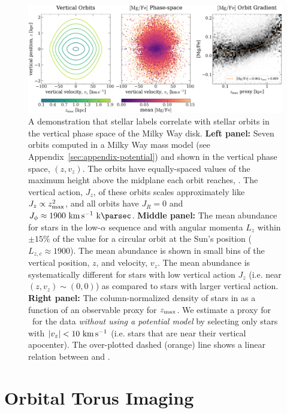 \begin{figure}[t!]
\begin{center}
\includegraphics[width=1\textwidth]{mgfe-zvz.pdf}
\end{center}
\caption{%
A demonstration that stellar labels correlate with stellar orbits in the vertical phase
space of the Milky Way disk.
\textbf{Left panel:} Seven orbits computed in a Milky Way mass model (see
Appendix~\ref{sec:appendix-potential}) and shown in the vertical phase space, $(z,
v_z)$.
The orbits have equally-spaced values of the maximum height above the midplane each
orbit reaches, \zmax.
The vertical action, $J_z$, of these orbits scales approximately like $J_z \propto
z_{\textrm{max}}^2$, and all orbits have $J_R=0$ and $J_\phi\approx 1900~\kms~\kpc$.
\textbf{Middle panel:} The mean  abundance for stars in the low-$\alpha$
sequence and with angular momenta $L_z$ within $\pm 15\%$ of the value for a circular
orbit at the Sun's position ($L_{z, c} \approx 1900$).
The mean  abundance is shown in small bins of the vertical position, $z$,
and velocity, $v_z$.
The mean abundance is systematically different for stars with low vertical action $J_z$
(i.e. near $(z, v_z) \sim (0, 0)$) as compared to stars with larger vertical action.
\label{fig:mgfe-zvz}
\textbf{Right panel:} The column-normalized density of stars in  as a
function of an observable proxy for $z_{\textrm{max}}$.
We estimate a proxy for \zmax\ for the data \emph{without using a potential model} by
selecting only stars with $|v_z| < 10~\kms$ (i.e. stars that are near their vertical
apocenter).
The over-plotted dashed (orange) line shows a linear relation between  and
\zmax.
}
\end{figure}


\section{Orbital Torus Imaging} \label{sec:oti}

